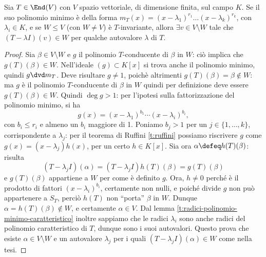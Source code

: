 \begin{lemma}
	Sia $T\in \End(V)$ con $V$ spazio vettoriale, di dimensione finita, sul campo $K$.
	Se il suo polinomio minimo è della forma $m_T(x) = (x-\lambda_1)^{r_1}\dots(x-\lambda_k)^{r_k}$, con $\lambda_i\in K$, e se $W\le V$ (con $W\ne V$) è $T$-invariante, allora $\exists v\in V\setminus W$ tale che $(T-\lambda I)(v)\in W$ per qualche autovalore $\lambda$ di $T$.
\end{lemma}
\begin{proof}
	Sia $\beta\in V\setminus W$ e $g$ il polinomio $T$-conducente di $\beta$ in $W$: ciò implica che $g(T)(\beta)\in W$.
	Nell'ideale $(g)\subset K[x]$ si trova anche il polinomio minimo, quindi $g\dvd m_T$.
	Deve risultare $g\ne 1$, poichè altrimenti $g(T)(\beta) = \beta\notin W$: ma $g$ è il polinomio $T$-conducente di $\beta$ in $W$ quindi per definizione deve essere $g(T)(\beta)\in W$.
	Quindi $\deg g>1$: per l'ipotesi sulla fattorizzazione del polinomio minimo, si ha
	\begin{equation*}
		g(x) = (x-\lambda_1)^{b_1}\cdots (x-\lambda_i)^{b_i},
	\end{equation*}
	con $b_i\le r_i$ e almeno un $b_i$ maggiore di 1.
	Poniamo $b_j > 1$ per un $j\in\{1,\dots,k\}$, corrispondente a $\lambda_j$: per il teorema di Ruffini \ref{t:ruffini} possiamo riscrivere $g$ come $g(x) = (x-\lambda_j)h(x)$, per un certo $h\in K[x]$.
	Sia ora $\alpha\defeq h(T)(\beta)$: risulta
	\begin{equation*}
		(T-\lambda_j I)(\alpha)=(T-\lambda_j I)h(T)(\beta)=g(T)(\beta)
	\end{equation*}
	e $g(T)(\beta)$ appartiene a $W$ per come è definito $g$.
	Ora, $h\ne 0$ perch\'e è il prodotto di fattori $(x-\lambda_i)^{b_i}$, certamente non nulli, e poich\'e divide $g$ non può appartenere a $S_T$, perciò $h(T)$ non ``porta'' $\beta$ in $W$.
	Dunque $\alpha=h(T)(\beta)\notin W$, e certamente $\alpha\in V$.
	Dal lemma \ref{t:radici-polinomio-minimo-caratteristico} inoltre sappiamo che le radici $\lambda_i$ sono anche radici del polinomio caratteristico di $T$, dunque sono i suoi autovalori.
	Questo prova che esiste $\alpha\in V\setminus W$ e un autovalore $\lambda_j$ per i quali $(T-\lambda_j I)(\alpha)\in W$ come nella tesi.
\end{proof}

